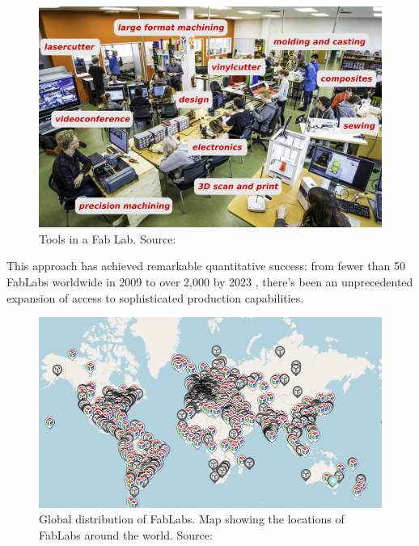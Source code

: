 \begin{figure}[H]
\centering
\includegraphics[width=1\textwidth]{figures/chapter2/fablab_tools.jpg}
\caption{Tools in a Fab Lab. Source: \cite{fabfoundation2024}}
\label{fig:fablab_tools}
\end{figure}

This approach has achieved remarkable quantitative success: from fewer than 50 FabLabs worldwide in 2009 to over 2,000 by 2023 \citep{fabfoundation2024}, there's been an unprecedented expansion of access to sophisticated production capabilities.

\begin{figure}[H]
\centering
\includegraphics[width=1\textwidth]{figures/chapter2/fablabsmap.png}
\caption{Global distribution of FabLabs. Map showing the locations of FabLabs around the world. Source: \cite{fabfoundation2024}}
\label{fig:fablabs_map}
\end{figure}

